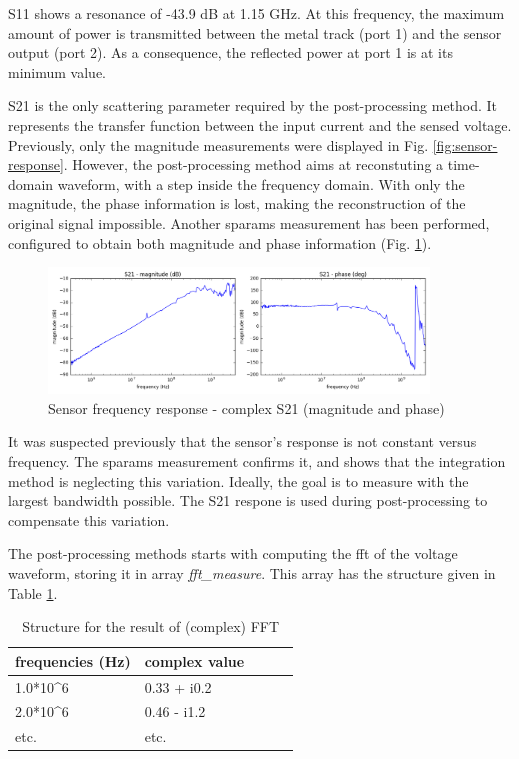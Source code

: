 S11 shows a resonance of -43.9 dB at 1.15 GHz.
At this frequency, the maximum amount of power is transmitted between the metal track (port 1) and the sensor output (port 2).
As a consequence, the reflected power at port 1 is at its minimum value.

S21 is the only scattering parameter required by the post-processing method.
It represents the transfer function between the input current and the sensed voltage.
Previously, only the magnitude measurements were displayed in Fig. \ref{fig:sensor-response}.
However, the post-processing method aims at reconstuting a time-domain waveform, with a step inside the frequency domain.
With only the magnitude, the phase information is lost, making the reconstruction of the original signal impossible.
Another \gls{sparams} measurement has been performed, configured to obtain both magnitude and phase information (Fig. \ref{fig:s21-response-complex}).

\begin{figure}[!h]
  \centering
  \includegraphics[width=0.9\textwidth]{src/3/figures/s21_freq_response.png}
  \caption{Sensor frequency response - complex S21 (magnitude and phase)}
  \label{fig:s21-response-complex}
\end{figure}

It was suspected previously that the sensor's response is not constant versus frequency.
The \gls{sparams} measurement confirms it, and shows that the integration method is neglecting this variation.
Ideally, the goal is to measure with the largest bandwidth possible.
The S21 respone is used during post-processing to compensate this variation.

The post-processing methods starts with computing the \gls{fft} of the voltage waveform, storing it in array \textit{fft\_measure}.
This array has the structure given in Table \ref{tab:complex-fft}.

\begin{table}[!h]
  \centering
  \begin{tabular}{@{}lllll@{}}
  \toprule
  frequencies (Hz)        & complex value                \\ \midrule
  1.0*10^6                & 0.33 + i0.2                  \\
  2.0*10^6                & 0.46 - i1.2                  \\
  etc.                    & etc.                         \\ \bottomrule
  \end{tabular}
  \caption{Structure for the result of (complex) FFT}
  \label{tab:complex-fft}
\end{table}

